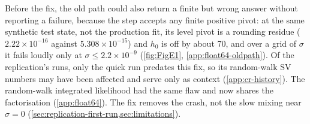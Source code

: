 Before the fix, the old path could also return a finite but wrong answer without reporting a failure, because the step accepts any finite positive pivot: at the same synthetic test state, not the production fit, its level pivot is a rounding residue ($2.22\times10^{-16}$ against $5.308\times10^{-15}$) and $h_0$ is off by about 70, and over a grid of $\sigma$ it fails loudly only at $\sigma \le 2.2\times10^{-9}$ (\cref{fig:FigE1}, \cref{app:float64-oldpath}). %
Of the replication's runs, only the quick run predates this fix, so its random-walk SV numbers may have been affected and serve only as context (\cref{app:cr-history}). %
The random-walk integrated likelihood had the same flaw and now shares the factorisation (\cref{app:float64}). %
The fix removes the crash, not the slow mixing near $\sigma = 0$ (\cref{sec:replication-first-run,sec:limitations}). %

